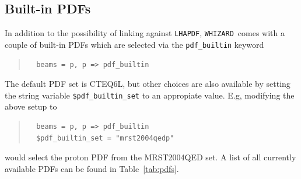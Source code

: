 \documentclass[12pt]{book}
\newcommand{\ttt}[1]{\texttt{#1}}
\newcommand{\whizard}{\ttt{WHIZARD}}
\newcommand{\lhapdf}{\ttt{LHAPDF}}
\begin{document}
\subsection{Built-in PDFs}
\label{sec:built-in-pdf}

In addition to the possibility of linking against \lhapdf, \whizard\
comes with a couple of built-in PDFs which are selected via the
\verb?pdf_builtin? keyword
%
\begin{quote}
\begin{footnotesize}
\begin{verbatim}
  beams = p, p => pdf_builtin
\end{verbatim}
\end{footnotesize}
\end{quote}
%

The default PDF set is CTEQ6L, but other choices are also available by
setting the string variable \verb?$pdf_builtin_set? to an
appropiate value. E.g, modifying the above
setup to
%
\begin{quote}
\begin{footnotesize}
\begin{verbatim}
  beams = p, p => pdf_builtin
  $pdf_builtin_set = "mrst2004qedp"
\end{verbatim}
\end{footnotesize}
\end{quote}
%
would select the proton PDF from the MRST2004QED set. A list of all currently
available PDFs can be found in Table~\ref{tab:pdfs}.
%
\end{document}
